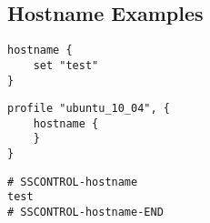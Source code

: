 \subsection{Hostname Examples}

\begin{lstlisting}[style=Sscontrol,
label={lst:hostname_example_script},
title={Sets the host name.}]
hostname {
    set "test"
}
\end{lstlisting}

\begin{lstlisting}[style=Sscontrol,
label={lst:hostname_ubuntu_profile},
title={Ubuntu hostname profile.}]
profile "ubuntu_10_04", {
    hostname {
    }
}
\end{lstlisting}

\begin{lstlisting}[style=rcfile_nonumbers,
label={lst:hostname_example},
title={Hostname configuration file example.}]
# SSCONTROL-hostname
test
# SSCONTROL-hostname-END
\end{lstlisting}

